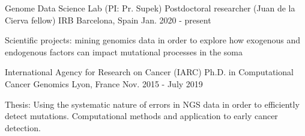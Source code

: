 

\begin{cventries}

	
  \cventry
    {Genome Data Science Lab (PI: Pr. Supek)} %
    {Postdoctoral researcher (Juan de la Cierva fellow)} %
    {IRB Barcelona, Spain} %
    {Jan. 2020 - present} %
    {
      \begin{cvitems} %
        \item {Scientific projects: mining genomics data in order to explore how exogenous and endogenous factors can impact mutational processes in the soma}
      \end{cvitems}
    }
    
    \cventry
    {International Agency for Research on Cancer (IARC)} %
    {Ph.D. in Computational Cancer Genomics} %
    {Lyon, France} %
    {Nov. 2015 - July 2019} %
    {
      \begin{cvitems} %
        \item {Thesis: Using the systematic nature of errors in NGS data in order to efficiently detect mutations. Computational methods and application to early cancer detection.}
      \end{cvitems}
    }




\end{cventries}
